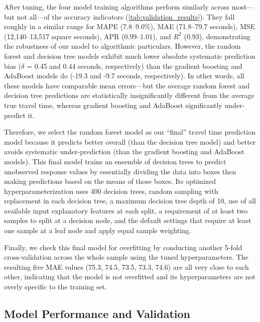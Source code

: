 \documentclass[12pt,letterpaper]{article} %
\begin{document}
After tuning, the four model training algorithms perform similarly across most---but not all---of the accuracy indicators (\autoref{tab:validation_results}). They fall roughly in a similar range for MAPE (7.8--9.0\%), MAE (71.8--79.7 seconds), MSE (12,140--13,517 square seconds), APR (0.99--1.01), and $R^2$ (0.93), demonstrating the robustness of our model to algorithmic particulars. However, the random forest and decision tree models exhibit much lower absolute systematic prediction bias ($\delta$ = 0.45 and 0.44 seconds, respectively) than the gradient boosting and AdaBoost models do (-19.3 and -9.7 seconds, respectively). In other words, all these models have comparable mean errors---but the average random forest and decision tree predictions are statistically insignificantly different from the average true travel time, whereas gradient boosting and AdaBoost significantly under-predict it.

Therefore, we select the random forest model as our \enquote{final} travel time prediction model because it predicts better overall (than the decision tree model) and better avoids systematic under-prediction (than the gradient boosting and AdaBoost models). This final model trains an ensemble of decision trees to predict unobserved response values by essentially dividing the data into boxes then making predictions based on the means of those boxes. Its optimized hyperparameterization uses 400 decision trees, random sampling with replacement in each decision tree, a maximum decision tree depth of 10, use of all available input explanatory features at each split, a requirement of at least two samples to split at a decision node, and the default settings that require at least one sample at a leaf node and apply equal sample weighting.

Finally, we check this final model for overfitting by conducting another 5-fold cross-validation across the whole sample using the tuned hyperparameters. The resulting five MAE values (75.3, 74.5, 73.5, 73.3, 74.6) are all very close to each other, indicating that the model is not overfitted and its hyperparameters are not overly specific to the training set.

\subsection{Model Performance and Validation}
\end{document}
